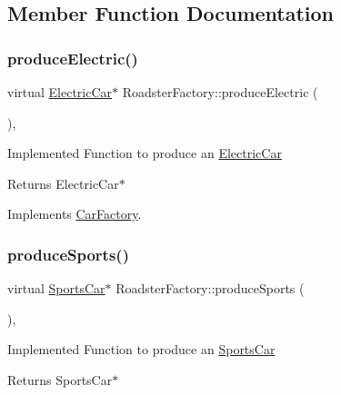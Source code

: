 \subsection{Member Function Documentation}
\mbox{\label{class_roadster_factory_abb3e30ce51a09d04e72af473f2899774}} 
\subsubsection{\texorpdfstring{produce\+Electric()}{produceElectric()}}
{\footnotesize\ttfamily virtual \mbox{\hyperlink{class_electric_car}{Electric\+Car}}$\ast$ Roadster\+Factory\+::produce\+Electric (\begin{DoxyParamCaption}{ }\end{DoxyParamCaption})\hspace{0.3cm}{\ttfamily [inline]}, {\ttfamily [virtual]}}

Implemented Function to produce an \mbox{\hyperlink{class_electric_car}{Electric\+Car}} \begin{DoxyReturn}{Returns}
Electric\+Car$\ast$ 
\end{DoxyReturn}


Implements \mbox{\hyperlink{class_car_factory_a2a9be1558ef604f44ea3588bcc06b3db}{Car\+Factory}}.

\mbox{\label{class_roadster_factory_a0de9b71d1c2c6e2ffd39a6c8a43dfc57}} 
\subsubsection{\texorpdfstring{produce\+Sports()}{produceSports()}}
{\footnotesize\ttfamily virtual \mbox{\hyperlink{class_sports_car}{Sports\+Car}}$\ast$ Roadster\+Factory\+::produce\+Sports (\begin{DoxyParamCaption}{ }\end{DoxyParamCaption})\hspace{0.3cm}{\ttfamily [inline]}, {\ttfamily [virtual]}}

Implemented Function to produce an \mbox{\hyperlink{class_sports_car}{Sports\+Car}} \begin{DoxyReturn}{Returns}
Sports\+Car$\ast$ 
\end{DoxyReturn}


